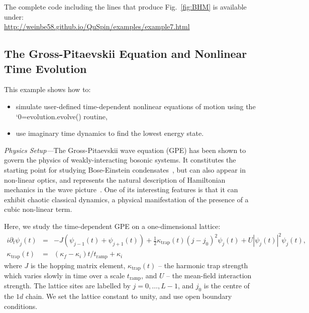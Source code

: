 \documentclass{SciPost}
\newcommand\0{\scalebox{-1}[1]{0}}
\let\svttfamily\ttfamily
\renewcommand\ttfamily{\svttfamily\catcode`0=\active }
\renewcommand\texttt{\bgroup\ttfamily\texttthelp}
\def\texttthelp#1{#1\egroup}
\begin{document}
The complete code including the lines that produce Fig.~\ref{fig:BHM} is available under:\\

\href{http://weinbe58.github.io/QuSpin/examples/example7.html}{http://weinbe58.github.io/QuSpin/examples/example7.html}\\

\subsection{The Gross-Pitaevskii Equation and Nonlinear Time Evolution}
\label{subsec:GP_dynamics}

This example shows how to:
\begin{itemize}
	\item simulate user-defined time-dependent nonlinear equations of motion using the \\ \texttt{evolution.evolve()} routine,
	\item use imaginary time dynamics to find the lowest energy state.
\end{itemize}

\noindent\emph{Physics Setup---}The Gross-Pitaevskii wave equation (GPE) has been shown to govern the physics of weakly-interacting bosonic systems. It constitutes the starting point for studying Bose-Einstein condensates~\cite{dalfovo_99}, but can also appear in non-linear optics\cite{sulem2007nonlinear}, and represents the natural description of Hamiltonian mechanics in the wave picture~\cite{polkovnikov2010phase}. One of its interesting features is that it can exhibit chaotic classical dynamics, a physical manifestation of the presence of a cubic non-linear term.

Here, we study the time-dependent GPE on a one-dimensional lattice:
\begin{eqnarray}
i\partial_t\psi_j(t) &=& -J\left( \psi_{j-1}(t) + \psi_{j+1}(t)\right) + \frac{1}{2}\kappa_\mathrm{trap}(t)(j-j_0)^2\psi_j(t) + U|\psi_j(t)|^2\psi_j(t), \nonumber \\
\kappa_\mathrm{trap}(t)&=&(\kappa_f-\kappa_i)t/t_\mathrm{ramp}+ \kappa_i
\label{eq:GPE}
\end{eqnarray}
where $J$ is the hopping matrix element, $\kappa_\mathrm{trap}(t)$ -- the harmonic trap strength which varies slowly in time over a scale $t_\mathrm{ramp}$, and $U$ -- the mean-field interaction strength. The lattice sites are labelled by $j=0,\dots,L-1$, and $j_0$ is the centre of the $1d$ chain. We set the lattice constant to unity, and use open boundary conditions.
\end{document}
